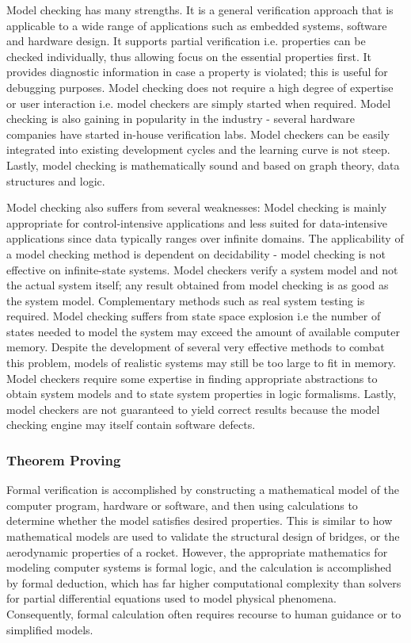 Model checking has many strengths. It is a general verification approach that is applicable to a wide range of applications such as embedded systems, software and hardware design. It supports partial verification i.e. properties can be checked individually, thus allowing focus on the essential properties first. It provides diagnostic information in case a property is violated; this is useful for debugging purposes. Model checking does not require a high degree of expertise or user interaction i.e. model checkers are simply started when required. Model checking is also gaining in popularity in the industry - several hardware companies have started in-house verification labs. Model checkers can be easily integrated into existing development cycles and the learning curve is not steep. Lastly, model checking is mathematically sound and based on graph theory, data structures and logic. 

Model checking also suffers from several weaknesses: Model checking is mainly appropriate for control-intensive applications and less suited for data-intensive applications since data typically ranges over infinite domains. The applicability of a model checking method is dependent on decidability - model checking is not effective on infinite-state systems. Model checkers verify a system model and not the actual system itself; any result obtained from model checking is as good as the system model. Complementary methods such as real system testing is required. Model checking suffers from state space explosion i.e the number of states needed to model the system may exceed the amount of available computer memory. Despite the development of several very effective methods to combat this problem, models of realistic systems may still be too large to fit in memory. Model checkers require some expertise in finding appropriate abstractions to obtain system models and to state system properties in logic formalisms. Lastly, model checkers are not guaranteed to yield correct results because the model checking engine may itself contain software defects. 

\subsubsection{Theorem Proving}

Formal verification is accomplished by constructing a mathematical model of the computer program, hardware or software, and then using calculations to determine whether the model satisfies desired properties. This is similar to how mathematical models are used to validate the structural design of bridges, or the aerodynamic properties of a rocket. However, the appropriate mathematics for modeling computer systems is formal logic, and the calculation is accomplished by formal deduction, which has far higher computational complexity than solvers for partial differential equations used to model physical phenomena. Consequently, formal calculation often requires recourse to human guidance or to simplified models.

